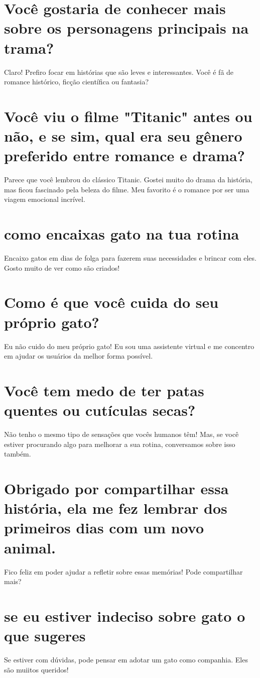 \documentclass[11pt,a4paper]{article}
\begin{document}
\section{Você gostaria de conhecer mais sobre os personagens principais na trama?}
Claro! Prefiro focar em histórias que são leves e interessantes. Você é fã de romance histórico, ficção científica ou fantasia?

\section{Você viu o filme "Titanic" antes ou não, e se sim, qual era seu gênero preferido entre romance e drama?}
Parece que você lembrou do clássico Titanic. Gostei muito do drama da história, mas ficou fascinado pela beleza do filme. Meu favorito é o romance por ser uma viagem emocional incrível.

\section{como encaixas gato na tua rotina}
Encaixo gatos em dias de folga para fazerem suas necessidades e brincar com eles. Gosto muito de ver como são criados!

\section{Como é que você cuida do seu próprio gato?}
Eu não cuido do meu próprio gato! Eu sou uma assistente virtual e me concentro em ajudar os usuários da melhor forma possível.

\section{Você tem medo de ter patas quentes ou cutículas secas?}
Não tenho o mesmo tipo de sensações que vocês humanos têm! Mas, se você estiver procurando algo para melhorar a sua rotina, conversamos sobre isso também.

\section{Obrigado por compartilhar essa história, ela me fez lembrar dos primeiros dias com um novo animal.}
Fico feliz em poder ajudar a refletir sobre essas memórias! Pode compartilhar mais?

\section{se eu estiver indeciso sobre gato o que sugeres}
Se estiver com dúvidas, pode pensar em adotar um gato como companhia. Eles são muiitos queridos!
\end{document}
